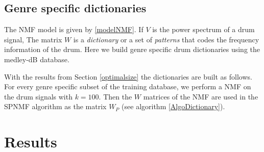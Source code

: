 \documentclass{article}
\begin{document}
\subsection{Genre specific dictionaries}\label{genrespecdict}

The NMF model is given by \eqref{modelNMF}. If $V$ is the power spectrum of a drum signal, The matrix $W$ is a {\em dictionary} or a set of {\em patterns} that codes the frequency information of the drum. Here we build genre specific drum dictionaries using the medley-dB database. %

With the results from Section \ref{optimalsize} the dictionaries are built as follows. For every genre specific subset of the training database, we perform a NMF on the drum signals with $k=100$. Then the $W$ matrices of the NMF are used in the SPNMF algorithm as the matrix $W_P$ (see algorithm \ref{AlgoDictionary}).

%   
%  


\section{Results}\label{sec:results}
\end{document}
